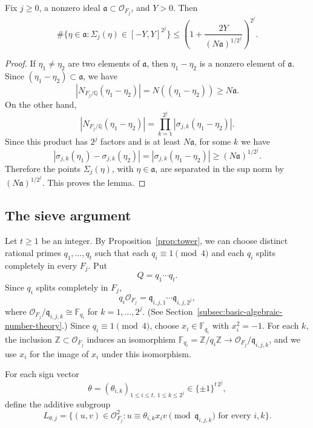 \begin{lemma}\label{lem:ideal-box}
Fix \(j\ge0\), a nonzero ideal \(\mathfrak a\subset\mathcal O_{F_j}\), and \(Y>0\).
Then
\[
\#\{\eta\in\mathfrak a:\Sigma_j(\eta)\in[-Y,Y]^{2^j}\}
\le
\left(1+\frac{2Y}{(N\mathfrak a)^{1/2^j}}\right)^{2^j}.
\]
\end{lemma}

\begin{proof}
If \(\eta_1\ne\eta_2\) are two elements of \(\mathfrak a\), then \(\eta_1-\eta_2\) is a nonzero element of \(\mathfrak a\).
Since \((\eta_1-\eta_2)\subset\mathfrak a\), we have
\[
|N_{F_j/\mathbb Q}(\eta_1-\eta_2)|
=
N((\eta_1-\eta_2))
\ge
N\mathfrak a.
\]
On the other hand,
\[
|N_{F_j/\mathbb Q}(\eta_1-\eta_2)|
=
\prod_{k=1}^{2^j} |\sigma_{j,k}(\eta_1-\eta_2)|.
\]
Since this product has \(2^j\) factors and is at least \(N\mathfrak a\), for some \(k\) we have
\[
|\sigma_{j,k}(\eta_1)-\sigma_{j,k}(\eta_2)|
=
|\sigma_{j,k}(\eta_1-\eta_2)|
\ge
(N\mathfrak a)^{1/2^j}.
\]
Therefore the points \(\Sigma_j(\eta)\), with \(\eta\in\mathfrak a\), are separated in the sup norm by \((N\mathfrak a)^{1/2^j}\).
This proves the lemma.
\end{proof}

\subsection{The sieve argument}
\label{subsec:sieve-argument}

Let \(t\ge1\) be an integer.
By Proposition~\ref{prop:tower}, we can choose distinct rational primes \(q_1,\ldots,q_t\) such that each \(q_i\equiv1\pmod4\) and each \(q_i\) splits completely in every \(F_j\).
Put
\[
Q=q_1\cdots q_t.
\]
Since \(q_i\) splits completely in \(F_j\),
\[
q_i\mathcal O_{F_j}
=
\mathfrak q_{i,j,1}\cdots\mathfrak q_{i,j,2^j},
\]
where \(\mathcal O_{F_j}/\mathfrak q_{i,j,k}\cong\mathbb F_{q_i}\) for \(k=1,\ldots,2^j\).
(See Section~\ref{subsec:basic-algebraic-number-theory}.)
Since \(q_i\equiv1\pmod4\), choose \(x_i\in\mathbb F_{q_i}\) with \(x_i^2=-1\).
For each \(k\), the inclusion \(\mathbb Z\subset\mathcal O_{F_j}\) induces an isomorphism \(\mathbb F_{q_i}=\mathbb Z/q_i\mathbb Z\to\mathcal O_{F_j}/\mathfrak q_{i,j,k}\), and we use \(x_i\) for the image of \(x_i\) under this isomorphism.

For each sign vector
\[
\theta=(\theta_{i,k})_{1\le i\le t,\ 1\le k\le 2^j}
\in\{\pm1\}^{t\,2^j},
\]
define the additive subgroup
\begin{equation}\label{eq:L-def}
L_{\theta,j}
=
\{(u,v)\in\mathcal O_{F_j}^2:
u\equiv\theta_{i,k}x_i v\pmod{\mathfrak q_{i,j,k}}
\text{ for every }i,k\}.
\end{equation}

